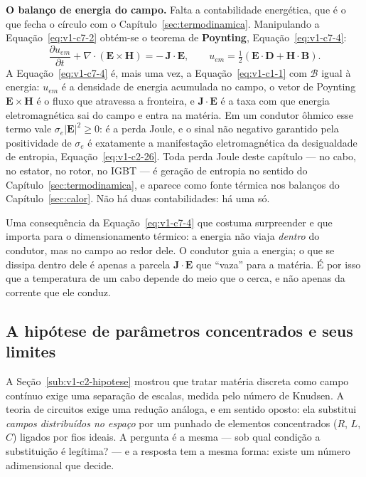 \documentclass[12pt,a4paper]{article}
\numberwithin{equation}{section}
\numberwithin{table}{section}
\numberwithin{figure}{section}
\begin{document}
\textbf{O balanço de energia do campo.} Falta a contabilidade energética, que é
o que fecha o círculo com o Capítulo~\ref{sec:termodinamica}. Manipulando a
Equação~\eqref{eq:v1-c7-2} obtém-se o teorema de \textbf{Poynting},
Equação~\eqref{eq:v1-c7-4}:
\begin{equation}\label{eq:v1-c7-4}
\frac{\partial u_{em}}{\partial t} + \nabla\cdot(\mathbf{E}\times\mathbf{H})
= -\,\mathbf{J}\cdot\mathbf{E},
\qquad
u_{em} = \tfrac{1}{2}\left(\mathbf{E}\cdot\mathbf{D} +
\mathbf{H}\cdot\mathbf{B}\right).
\end{equation}
A Equação~\eqref{eq:v1-c7-4} é, mais uma vez, a Equação~\eqref{eq:v1-c1-1} com
$\mathcal{B}$ igual à energia: $u_{em}$ é a densidade de energia acumulada no
campo, o vetor de Poynting $\mathbf{E}\times\mathbf{H}$ é o fluxo que atravessa
a fronteira, e $\mathbf{J}\cdot\mathbf{E}$ é a taxa com que energia
eletromagnética sai do campo e entra na matéria. Em um condutor ôhmico esse
termo vale $\sigma_e|\mathbf{E}|^2 \geq 0$: é a perda Joule, e o sinal não
negativo garantido pela positividade de $\sigma_e$ é exatamente a
manifestação eletromagnética da desigualdade de entropia,
Equação~\eqref{eq:v1-c2-26}. Toda perda Joule deste capítulo --- no cabo, no
estator, no rotor, no IGBT --- é geração de entropia no sentido do
Capítulo~\ref{sec:termodinamica}, e aparece como fonte térmica nos balanços do
Capítulo~\ref{sec:calor}. Não há duas contabilidades: há uma só.

Uma consequência da Equação~\eqref{eq:v1-c7-4} que costuma surpreender e que
importa para o dimensionamento térmico: a energia não viaja \emph{dentro} do
condutor, mas no campo ao redor dele. O condutor guia a energia; o que se
dissipa dentro dele é apenas a parcela $\mathbf{J}\cdot\mathbf{E}$ que
``vaza'' para a matéria. É por isso que a temperatura de um cabo depende do
meio que o cerca, e não apenas da corrente que ele conduz.

\subsection{A hipótese de parâmetros concentrados e seus
limites}\label{sub:v1-c7-concentrados}

A Seção~\ref{sub:v1-c2-hipotese} mostrou que tratar matéria discreta como campo
contínuo exige uma separação de escalas, medida pelo número de Knudsen. A
teoria de circuitos exige uma redução análoga, e em sentido oposto: ela
substitui \emph{campos distribuídos no espaço} por um punhado de elementos
concentrados ($R$, $L$, $C$) ligados por fios ideais. A pergunta é a mesma ---
sob qual condição a substituição é legítima? --- e a resposta tem a mesma
forma: existe um número adimensional que decide.
\end{document}
